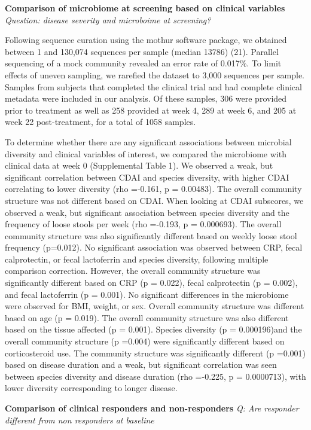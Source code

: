 \documentclass[11pt,]{article}
\begin{document}
\textbf{Comparison of microbiome at screening based on clinical
variables} \emph{Question: disease severity and microboime at
screening?}

Following sequence curation using the mothur software package, we
obtained between 1 and 130,074 sequences per sample (median 13786) (21).
Parallel sequencing of a mock community revealed an error rate of
0.017\%. To limit effects of uneven sampling, we rarefied the dataset to
3,000 sequences per sample. Samples from subjects that completed the
clinical trial and had complete clinical metadata were included in our
analysis. Of these samples, 306 were provided prior to treatment as well
as 258 provided at week 4, 289 at week 6, and 205 at week 22
post-treatment, for a total of 1058 samples.

To determine whether there are any significant associations between
microbial diversity and clinical variables of interest, we compared the
microbiome with clinical data at week 0 (Supplemental Table 1). We
observed a weak, but significant correlation between CDAI and species
diversity, with higher CDAI correlating to lower diversity (rho =-0.161,
p = 0.00483). The overall community structure was not different based on
CDAI. When looking at CDAI subscores, we observed a weak, but
significant association between species diversity and the frequency of
loose stools per week (rho =-0.193, p = 0.000693). The overall community
structure was also significantly different based on weekly loose stool
frequency (p=0.012). No significant association was observed between
CRP, fecal calprotectin, or fecal lactoferrin and species diversity,
following multiple comparison correction. However, the overall community
structure was significantly different based on CRP (p = 0.022), fecal
calprotectin (p = 0.002), and fecal lactoferrin (p = 0.001). No
significant differences in the microbiome were observed for BMI, weight,
or sex. Overall community structure was different based on age (p =
0.019). The overall community structure was also different based on the
tissue affected (p = 0.001). Species diversity (p = 0.000196)and the
overall community structure (p =0.004) were significantly different
based on corticosteroid use. The community structure was significantly
different (p =0.001) based on disease duration and a weak, but
significant correlation was seen between species diversity and disease
duration (rho =-0.225, p = 0.0000713), with lower diversity
corresponding to longer disease.

\textbf{Comparison of clinical responders and non-responders} \emph{Q:
Are responder different from non responders at baseline}
\end{document}
